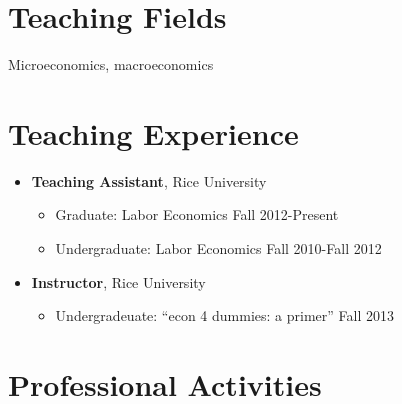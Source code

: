 \documentclass{article}[12]
\begin{document}
\section{Teaching Fields}

Microeconomics, macroeconomics


\section{Teaching Experience}

\begin{itemize}[itemsep=0.5em]
    
    \item \textbf{Teaching Assistant}, Rice University 
    \begin{itemize}
        \item Graduate: Labor Economics \hfill Fall 2012-Present 
        \item Undergraduate: Labor Economics \hfill Fall 2010-Fall 2012
    \end{itemize}
    
    \item \textbf{Instructor}, Rice University
    \begin{itemize}
        \item Undergradeuate: ``econ 4 dummies: a primer''  \hfill Fall 2013
    \end{itemize}

\end{itemize}


\section{Professional Activities}
\end{document}
